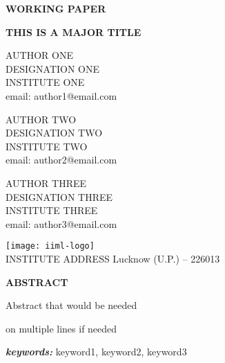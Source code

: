 \thispagestyle{empty}

\hfill\textbf{WORKING PAPER}

\vfill

\begin{center}
    \textbf{THIS IS A MAJOR TITLE}
\end{center}

\vfill

\begin{center}

    AUTHOR ONE\\
    DESIGNATION ONE\\
    INSTITUTE ONE\\
    email: author1@email.com\\

    \vspace{1\baselineskip}

    AUTHOR TWO\\
    DESIGNATION TWO\\
    INSTITUTE TWO\\
    email: author2@email.com\\

    \vspace{1\baselineskip}

    AUTHOR THREE\\
    DESIGNATION THREE\\
    INSTITUTE THREE\\
    email: author3@email.com\\

    \vspace{1cm}

\end{center}

\vfill

\begin{center}
    \texttt{[image: iiml-logo]}\\
    INSTITUTE ADDRESS
    Lucknow (U.P.)  -- 226013\\
\end{center}

\newpage

\vspace{\fill}

\begin{center}
\textbf{ABSTRACT}
\end{center}

    Abstract that would be needed

    on multiple lines if needed

\emph{\textbf{keywords:}} keyword1, keyword2, keyword3

\vfill

\newpage

\doublespacing

